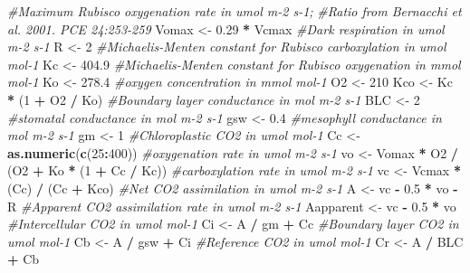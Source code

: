 \documentclass[
]{krantz}
\makeatletter
\newenvironment{Shaded}{\begin{snugshade}}{\end{snugshade}}
\newcommand{\CommentTok}[1]{\textcolor[rgb]{0.56,0.35,0.01}{\textit{#1}}}
\newcommand{\DecValTok}[1]{\textcolor[rgb]{0.00,0.00,0.81}{#1}}
\newcommand{\FloatTok}[1]{\textcolor[rgb]{0.00,0.00,0.81}{#1}}
\newcommand{\KeywordTok}[1]{\textcolor[rgb]{0.13,0.29,0.53}{\textbf{#1}}}
\newcommand{\NormalTok}[1]{#1}
\newcommand{\OperatorTok}[1]{\textcolor[rgb]{0.81,0.36,0.00}{\textbf{#1}}}
\newcommand{\StringTok}[1]{\textcolor[rgb]{0.31,0.60,0.02}{#1}}
\newenvironment{kframe}{%
\medskip{}
\setlength{\fboxsep}{.8em}
 \def\at@end@of@kframe{}%
 \ifinner\ifhmode%
  \def\at@end@of@kframe{\end{minipage}}%
  \begin{minipage}{\columnwidth}%
 \fi\fi%
 \def\FrameCommand##1{\hskip\@totalleftmargin \hskip-\fboxsep
 \colorbox{shadecolor}{##1}\hskip-\fboxsep
     \hskip-\linewidth \hskip-\@totalleftmargin \hskip\columnwidth}%
 \MakeFramed {\advance\hsize-\width
   \@totalleftmargin\z@ \linewidth\hsize
   \@setminipage}}%
 {\par\unskip\endMakeFramed%
 \at@end@of@kframe}
\renewenvironment{Shaded}{\begin{kframe}}{\end{kframe}}
\makeatother
\begin{document}
\begin{Shaded}
\begin{Highlighting}[]
\CommentTok{\#Maximum Rubisco oxygenation rate in umol m{-}2 s{-}1;}
\CommentTok{\#Ratio from Bernacchi et al. 2001. PCE 24:253{-}259}
\NormalTok{Vomax \textless{}{-}}\StringTok{ }\FloatTok{0.29} \OperatorTok{*}\StringTok{ }\NormalTok{Vcmax}
\CommentTok{\#Dark respiration in umol m{-}2 s{-}1}
\NormalTok{R \textless{}{-}}\StringTok{ }\DecValTok{2}
\CommentTok{\#Michaelis{-}Menten constant for Rubisco carboxylation in umol mol{-}1}
\NormalTok{Kc \textless{}{-}}\StringTok{ }\FloatTok{404.9}
\CommentTok{\#Michaelis{-}Menten constant for Rubisco oxygenation in mmol mol{-}1}
\NormalTok{Ko \textless{}{-}}\StringTok{ }\FloatTok{278.4}
\CommentTok{\#oxygen concentration in mmol mol{-}1}
\NormalTok{O2 \textless{}{-}}\StringTok{ }\DecValTok{210}
\NormalTok{Kco \textless{}{-}}\StringTok{ }\NormalTok{Kc }\OperatorTok{*}\StringTok{ }\NormalTok{(}\DecValTok{1} \OperatorTok{+}\StringTok{ }\NormalTok{O2 }\OperatorTok{/}\StringTok{ }\NormalTok{Ko)}
\CommentTok{\#Boundary layer conductance in mol m{-}2 s{-}1}
\NormalTok{BLC \textless{}{-}}\StringTok{ }\DecValTok{2}
\CommentTok{\#stomatal conductance in mol m{-}2 s{-}1}
\NormalTok{gsw \textless{}{-}}\StringTok{ }\FloatTok{0.4}
\CommentTok{\#mesophyll conductance in mol m{-}2 s{-}1}
\NormalTok{gm \textless{}{-}}\StringTok{ }\DecValTok{1}
\CommentTok{\#Chloroplastic CO2 in umol mol{-}1}
\NormalTok{Cc \textless{}{-}}\StringTok{ }\KeywordTok{as.numeric}\NormalTok{(}\KeywordTok{c}\NormalTok{(}\DecValTok{25}\OperatorTok{:}\DecValTok{400}\NormalTok{))}
\CommentTok{\#oxygenation rate in umol m{-}2 s{-}1}
\NormalTok{vo \textless{}{-}}\StringTok{ }\NormalTok{Vomax }\OperatorTok{*}\StringTok{ }\NormalTok{O2 }\OperatorTok{/}\StringTok{ }\NormalTok{(O2 }\OperatorTok{+}\StringTok{ }\NormalTok{Ko }\OperatorTok{*}\StringTok{ }\NormalTok{(}\DecValTok{1} \OperatorTok{+}\StringTok{ }\NormalTok{Cc }\OperatorTok{/}\StringTok{ }\NormalTok{Kc))}
\CommentTok{\#carboxylation rate in umol m{-}2 s{-}1}
\NormalTok{vc \textless{}{-}}\StringTok{ }\NormalTok{Vcmax }\OperatorTok{*}\StringTok{ }\NormalTok{(Cc) }\OperatorTok{/}\StringTok{ }\NormalTok{(Cc }\OperatorTok{+}\StringTok{ }\NormalTok{Kco)}
\CommentTok{\#Net CO2 assimilation in umol m{-}2 s{-}1}
\NormalTok{A \textless{}{-}}\StringTok{ }\NormalTok{vc }\OperatorTok{{-}}\StringTok{ }\FloatTok{0.5} \OperatorTok{*}\StringTok{ }\NormalTok{vo }\OperatorTok{{-}}\StringTok{ }\NormalTok{R}
\CommentTok{\#Apparent CO2 assimilation rate in umol m{-}2 s{-}1}
\NormalTok{Aapparent \textless{}{-}}\StringTok{ }\NormalTok{vc }\OperatorTok{{-}}\StringTok{ }\FloatTok{0.5} \OperatorTok{*}\StringTok{ }\NormalTok{vo}
\CommentTok{\#Intercellular CO2 in umol mol{-}1}
\NormalTok{Ci \textless{}{-}}\StringTok{ }\NormalTok{A }\OperatorTok{/}\StringTok{ }\NormalTok{gm }\OperatorTok{+}\StringTok{ }\NormalTok{Cc}
\CommentTok{\#Boundary layer CO2 in umol mol{-}1}
\NormalTok{Cb \textless{}{-}}\StringTok{ }\NormalTok{A }\OperatorTok{/}\StringTok{ }\NormalTok{gsw }\OperatorTok{+}\StringTok{ }\NormalTok{Ci}
\CommentTok{\#Reference CO2 in umol mol{-}1}
\NormalTok{Cr \textless{}{-}}\StringTok{ }\NormalTok{A }\OperatorTok{/}\StringTok{ }\NormalTok{BLC }\OperatorTok{+}\StringTok{ }\NormalTok{Cb}


\end{Highlighting}
\end{Shaded}
\end{document}
